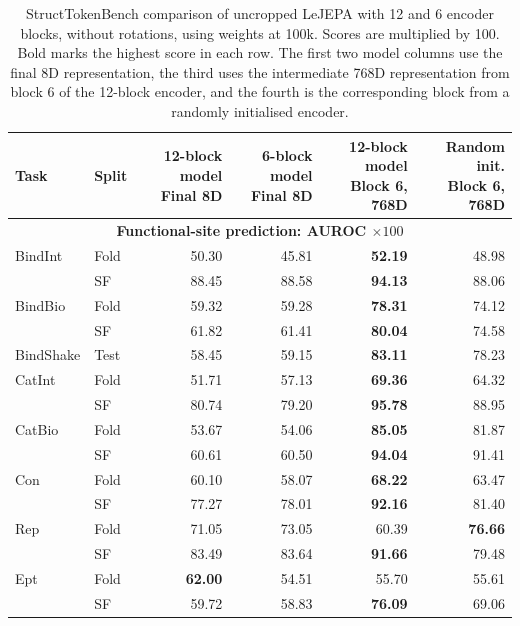 \documentclass{article}
\begin{document}
\begin{table}[!htbp]
\centering
\setlength{\tabcolsep}{4pt}
\renewcommand{\arraystretch}{0.86}
\fontsize{7.6}{8.8}\selectfont
\caption{StructTokenBench comparison of uncropped LeJEPA with 12 and 6 encoder blocks, without rotations, using weights at 100k. Scores are multiplied by 100. Bold marks the highest score in each row. The first two model columns use the final 8D representation, the third uses the intermediate 768D representation from block 6 of the 12-block encoder, and the fourth is the corresponding block from a randomly initialised encoder.}
\label{tab:results-encoder-depth}
\begin{tabular}{@{}llrrrr@{}}
\toprule
Task & Split & \shortstack{12-block model\\Final 8D} & \shortstack{6-block model\\Final 8D} & \shortstack{12-block model\\Block 6, 768D} & \shortstack{Random init.\\Block 6, 768D} \\
\midrule
\multicolumn{6}{c}{\textbf{Functional-site prediction: AUROC $\times100$}} \\
\midrule
BindInt & Fold & 50.30 & 45.81 & \textbf{52.19} & 48.98 \\
 & SF & 88.45 & 88.58 & \textbf{94.13} & 88.06 \\
BindBio & Fold & 59.32 & 59.28 & \textbf{78.31} & 74.12 \\
 & SF & 61.82 & 61.41 & \textbf{80.04} & 74.58 \\
BindShake & Test & 58.45 & 59.15 & \textbf{83.11} & 78.23 \\
CatInt & Fold & 51.71 & 57.13 & \textbf{69.36} & 64.32 \\
 & SF & 80.74 & 79.20 & \textbf{95.78} & 88.95 \\
CatBio & Fold & 53.67 & 54.06 & \textbf{85.05} & 81.87 \\
 & SF & 60.61 & 60.50 & \textbf{94.04} & 91.41 \\
Con & Fold & 60.10 & 58.07 & \textbf{68.22} & 63.47 \\
 & SF & 77.27 & 78.01 & \textbf{92.16} & 81.40 \\
Rep & Fold & 71.05 & 73.05 & 60.39 & \textbf{76.66} \\
 & SF & 83.49 & 83.64 & \textbf{91.66} & 79.48 \\
Ept & Fold & \textbf{62.00} & 54.51 & 55.70 & 55.61 \\
 & SF & 59.72 & 58.83 & \textbf{76.09} & 69.06 \\

\end{tabular}
\end{table}
\end{document}
